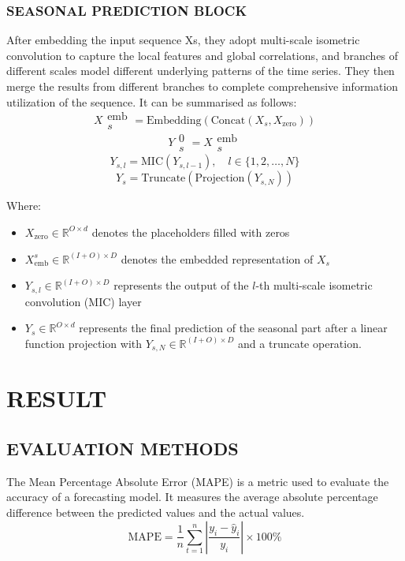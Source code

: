 \documentclass[conference]{IEEEtran}
\begin{document}
\subsubsection{SEASONAL PREDICTION BLOCK}
After embedding the input sequence Xs, they adopt multi-scale isometric convolution to capture the local features and global correlations, and branches of different scales model different underlying patterns of the time series. They then merge the results from different branches to complete comprehensive information utilization of the sequence. It can be summarised as follows:
\[X{\substack{\text{emb}\\s}}{} = {\text{Embedding}}(\text{Concat}(X_s, X_{\text{zero}}))\]
\[Y{\substack{\text{0}\\s}}{} = X{\substack{\text{emb}\\s}}{}\]
\[Y_{s,l} = \text{MIC}(Y_{s,l-1}), \quad l \in \{1, 2, \ldots, N\}\]
\[Y_s = \text{Truncate}(\text{Projection}(Y_{s,N}))\]

Where:
\begin{itemize}
    \item \(X_{\text{zero}} \in \mathbb{R}^{O \times d}\) denotes the placeholders filled with zeros
    \item \(X_{\text{emb}}^s \in \mathbb{R}^{(I+O) \times D}\) denotes the embedded representation of \(X_s\)
    \item \(Y_{s,l} \in \mathbb{R}^{(I+O) \times D}\) represents the output of the \(l\)-th multi-scale isometric convolution (MIC) layer
    \item \(Y_s \in \mathbb{R}^{O \times d}\) represents the final prediction of the seasonal part after a linear function projection with \(Y_{s,N} \in \mathbb{R}^{(I+O) \times D}\) and a truncate operation.
\end{itemize}

\section{RESULT}

\subsection{EVALUATION METHODS}
The Mean Percentage Absolute Error (MAPE) is a metric used to evaluate the accuracy of a forecasting model. It measures the average absolute percentage difference between the predicted values and the actual values. 
\[\text{MAPE} = \frac{1}{n} \sum_{t=1}^{n} \left| \frac{y_i - \hat{y}_i}{y_i} \right| \times 100\%\]
\end{document}
